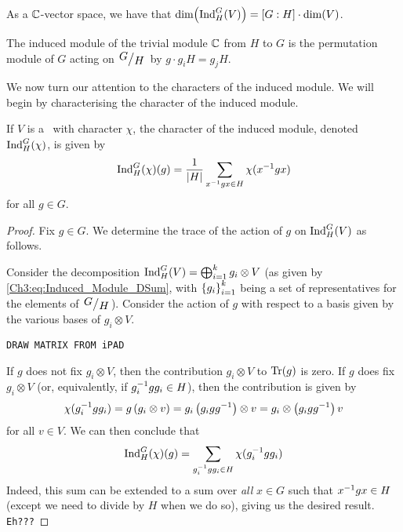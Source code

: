 \begin{corollary}
    As a $\mathbb{C}$-vector space, we have that $\displaystyle \dim\!\left( \operatorname{Ind}_H^G(V) \right) = \left[ G : H \right] \cdot \dim\!\left( V \right)$.
\end{corollary}

\begin{boxexample}
    The induced module of the trivial module $\mathbb{C}$ from $H$ to $G$ is the permutation module of $G$ acting on $\quotient{G}{H}$ by $g \cdot g_i H = g_j H$.
\end{boxexample}

We now turn our attention to the characters of the induced module. We will begin by characterising the character of the induced module.

\begin{proposition}
    If $V$ is a \CHM\ with character $\chi$, the character of the induced module, denoted $\operatorname{Ind}_H^G(\chi)$, is given by
    \begin{align*}
        \operatorname{Ind}_H^G(\chi)(g) = \frac{1}{\left\lvert H \right\rvert} \sum_{x^{-1} g x \in H} \chi(x^{-1} g x)
    \end{align*}
    for all $g \in G$.
\end{proposition}
\begin{proof}
    Fix $g \in G$. We determine the trace of the action of $g$ on $\operatorname{Ind}_H^G(V)$ as follows.

    Consider the decomposition $\operatorname{Ind}_H^G(V) = \bigoplus_{i=1}^{k} g_i \otimes V$ (as given by \eqref{Ch3:eq:Induced_Module_DSum}, with $\left\{ g_i \right\}_{i=1}^k$ being a set of representatives for the elements of $\quotient{G}{H}$). Consider the action of $g$ with respect to a basis given by the various bases of $g_i \otimes V$.

    \verb|DRAW MATRIX FROM iPAD|

    If $g$ does not fix $g_i \otimes V$, then the contribution $g_i \otimes V$ to $\operatorname{Tr}\!\left( g \right)$ is zero. If $g$ does fix $g_i \otimes V$ (or, equivalently, if $g_i^{-1} g g_i \in H$), then the contribution is given by
    \begin{align*}
        \chi(g_i^{-1} g g_i) = g \left( g_i \otimes v \right) = g_i \left( g_i g g^{-1} \right) \otimes v = g_i \otimes \left( g_i g g^{-1} \right)v
    \end{align*}
    for all $v \in V$. We can then conclude that
    \begin{align*}
        \operatorname{Ind}_H^G(\chi)(g) = \sum_{g_i^{-1} g g_i \in H} \chi(g_i^{-1} g g_i)
    \end{align*}
    Indeed, this sum can be extended to a sum over \textit{all} $x \in G$ such that $x^{-1} g x \in H$ (except we need to divide by $H$ when we do so), giving us the desired result. \verb|Eh???|
\end{proof}

